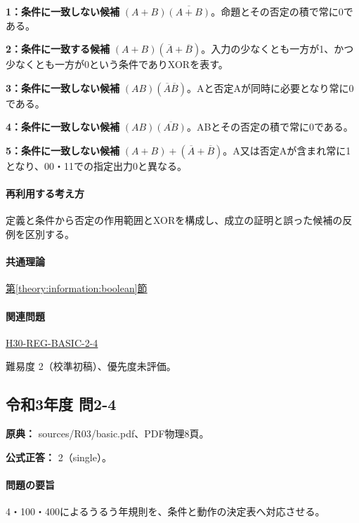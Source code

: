 \noindent\textbf{1：条件に一致しない候補} \((A+B)\overline{(A+B)}\)。命題とその否定の積で常に0である。\par

\noindent\textbf{2：条件に一致する候補} \((A+B)(\overline A+\overline B)\)。入力の少なくとも一方が1、かつ少なくとも一方が0という条件でありXORを表す。\par

\noindent\textbf{3：条件に一致しない候補} \((AB)(\overline A\overline B)\)。Aと否定Aが同時に必要となり常に0である。\par

\noindent\textbf{4：条件に一致しない候補} \((AB)\overline{(AB)}\)。ABとその否定の積で常に0である。\par

\noindent\textbf{5：条件に一致しない候補} \((A+B)+(\overline A+\overline B)\)。A又は否定Aが含まれ常に1となり、00・11での指定出力0と異なる。\par

\paragraph{再利用する考え方} 定義と条件から否定の作用範囲とXORを構成し、成立の証明と誤った候補の反例を区別する。

\paragraph{共通理論} \hyperref[theory:information:boolean]{第\ref*{theory:information:boolean}節}

\paragraph{関連問題} \hyperref[q:h30-reg-basic-2-4]{H30-REG-BASIC-2-4}

\par 難易度 2（校準初稿）、優先度未評価。

\subsection{令和3年度 問2-4}
\label{q:r03-reg-basic-2-4}

\noindent\textbf{原典：} sources/R03/basic.pdf、PDF物理8頁。

\textbf{公式正答：} 2（single）。

\paragraph{問題の要旨} 4・100・400によるうるう年規則を、条件と動作の決定表へ対応させる。

